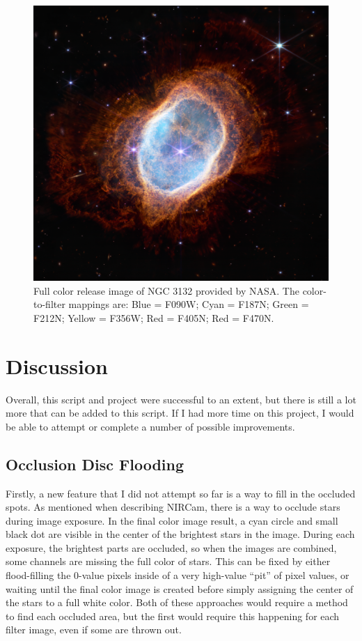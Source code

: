 \documentclass[10pt,twocolumn,letterpaper]{article}
\begin{document}
\begin{figure}[t]
  \centering
  \includegraphics[scale=0.825]{wiki}
  \caption{Full color release image of NGC 3132 provided by NASA. The color-to-filter mappings are: Blue = F090W; Cyan = F187N; Green = F212N; Yellow = F356W; Red = F405N; Red = F470N.\cite{3132}}
  \label{fig:original}
\end{figure}

\section{Discussion}
\label{sec:disc}

Overall, this script and project were successful to an extent, but there is still a lot more that can be added to this script. If I had more time on this project, I would be able to attempt or complete a number of possible improvements.

\subsection{Occlusion Disc Flooding}

Firstly, a new feature that I did not attempt so far is a way to fill in the occluded spots. As mentioned when describing NIRCam, there is a way to occlude stars during image exposure. In the final color image result, a cyan circle and small black dot are visible in the center of the brightest stars in the image. 
During each exposure, the brightest parts are occluded, so when the images are combined, some channels are missing the full color of stars. This can be fixed by either flood-filling the 0-value pixels inside of a very high-value ``pit'' of pixel values, or waiting until the final color image is created before simply assigning the center of the stars to a full white color. Both of these approaches would require a method to find each occluded area, but the first would require this happening for each filter image, even if some are thrown out.
\end{document}
